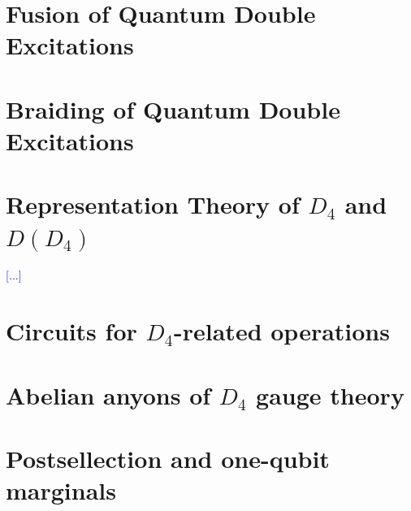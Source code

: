 \documentclass[two column]{article}
\newcommand{\jovan}[1]{\textcolor{blue}{[#1]}}
\begin{document}
\section{Fusion of Quantum Double Excitations}\label{app:fusion}

\section{Braiding of Quantum Double Excitations}\label{app:braid}

\section{Representation Theory of $D_4$ and $D(D_4)$}\label{app:reps}
\jovan{$\ldots$}

\section{Circuits for $D_4$-related operations}\label{app:cirqs}

\section{Abelian anyons of $D_4$ gauge theory}\label{app:abl}

\section{Postsellection and one-qubit marginals}\label{app:marg}




\end{document}
